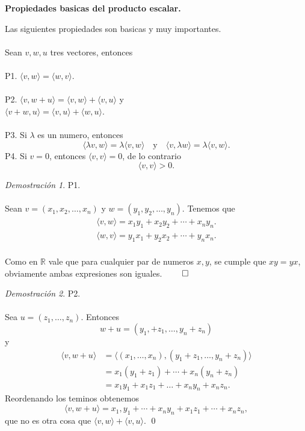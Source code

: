 \documentclass{article}
\theoremstyle{definition}
\theoremstyle{definition}
\theoremstyle{remark}
\newtheorem*{demo}{Demostración}
\begin{document}
\begin{center}
\textbf{Propiedades basicas del producto escalar.}
\end{center}
Las siguientes propiedades son basicas y muy importantes.\\\\
Sean $v,w,u$ tres vectores, entonces \\\\
\textcolor{azulp2}{P1.} $\langle v,w \rangle = \langle w,v \rangle.$\\\\
\textcolor{azulp2}{P2.} $\langle v,w+u\rangle = \langle v,w \rangle + \langle v,u \rangle$ y \\
\phantom{P2.} $\langle v+w,u \rangle = \langle v,u \rangle + \langle w,u \rangle$.\\\\
\textcolor{azulp2}{P3.} Si $\lambda$ es un numero, entonces \[
  \langle \lambda v ,w \rangle = \lambda \langle v,w \rangle \quad \text{y} \quad \langle v, \lambda w \rangle = \lambda \langle v,w \rangle.
\]
\textcolor{azulp2}{P4.} Si $v=0$, entonces $\langle v,v \rangle = 0$, de lo contrario \[
\langle v,v \rangle > 0.
\]
\begin{demo} \textcolor{rojop2}{P1.}\\\\
  Sean $v=(x_1,x_2,\dots,x_n)$ y $w=(y_1,y_2,\dots ,y_n)$. Tenemos que \[
    \begin{aligned}
      \langle v,w \rangle = x_1y_1+x_2y_2+\cdots+x_ny_n.\\
      \langle w,v \rangle = y_1x_1+y_2x_2+\cdots+y_nx_n.\\
    \end{aligned}
  \]
\end{demo}
Como en $\mathbb{R}$ vale que para cualquier par de numeros $x,y$, se cumple que $xy=yx$, obviamente ambas expresiones son iguales. $\qed$
\begin{demo}
\textcolor{rojop2}{P2.} \\\\
Sea $u=(z_1,\dots,z_n).$ Entonces \[
w+u=(y_1,+z_1,\dots,y_n+z_n)
\]
y
\[
\begin{aligned}
  \langle v,w+u \rangle &= \big\langle (x_1,\dots,x_n),(y_1+z_1,\dots,y_n+z_n) \big\rangle \\
                        &= x_1(y_1+z_1)+\cdots + x_n(y_n+z_n) \\ 
                        &= x_1y_1+x_1z_1+\dots+x_ny_n+x_nz_n.
\end{aligned}
\]
Reordenando los teminos obtenemos \[
\langle v,w+u \rangle = x_1,y_1+ \cdots + x_ny_n + x_1z_1 + \cdots + x_n z_n,
\]
que no es otra cosa que $\langle v,w\rangle + \langle v,u \rangle$. \qed
\end{demo}
\end{document}
